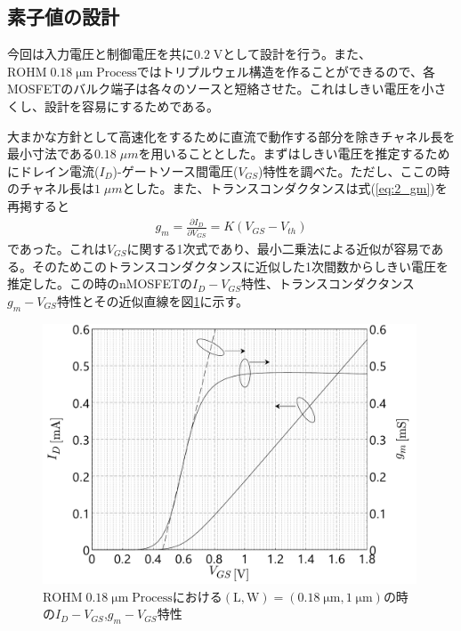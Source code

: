         \subsection{素子値の設計}
            今回は入力電圧と制御電圧を共に$0.2\;\mathrm{V}$として設計を行う。また、\\$\mathrm{ROHM\;0.18\;\mu m\;Process}$ではトリプルウェル構造を作ることができるので、各MOSFETのバルク端子は各々のソースと短絡させた。これはしきい電圧を小さくし、設計を容易にするためである。\par
            大まかな方針として高速化をするために直流で動作する部分を除きチャネル長を最小寸法である$0.18\;\mu m$を用いることとした。まずはしきい電圧を推定するためにドレイン電流($I_{D}$)-ゲートソース間電圧($V_{GS}$)特性を調べた。ただし、ここの時のチャネル長は$1\;\mu m$とした。また、トランスコンダクタンスは式(\ref{eq:2_gm})を再掲すると
            \begin{align*}
                g_{m}=\frac{\partial I_{D}}{\partial V_{GS}}=K(V_{GS}-V_{th})
            \end{align*}
            であった。これは$V_{GS}$に関する1次式であり、最小二乗法による近似が容易である。そのためこのトランスコンダクタンスに近似した1次間数からしきい電圧を推定した。この時のnMOSFETの$I_{D}-V_{GS}$特性、トランスコンダクタンス$g_{m}-V_{GS}$特性とその近似直線を図\ref{fig:3_vth_est}に示す。
            \begin{figure}[!b]
                \centering
                \includegraphics[width=0.99\textwidth]{figures/chapter3/id_vgs.pdf}
                \caption{$\mathrm{ROHM\;0.18\;\mu m\;Process}$における$\mathrm{(L,W)}=(0.18\;\mathrm{\mu m},1\;\mathrm{\mu m})$の時の$I_{D}-V_{GS}$,$g_{m}-V_{GS}$特性}
                \label{fig:3_vth_est}
            \end{figure}
